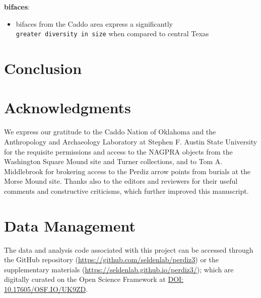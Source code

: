 \documentclass[smallextended]{svjour3}       %
\providecommand{\tightlist}{%
  \setlength{\itemsep}{0pt}\setlength{\parskip}{0pt}}
\begin{document}
\textbf{bifaces}:

\begin{itemize}
\tightlist
\item
  bifaces from the Caddo area express a significantly
  \texttt{greater\ diversity\ in\ size} when compared to central Texas
\end{itemize}

\hypertarget{conclusion}{%
\section{Conclusion}\label{conclusion}}

\hypertarget{acknowledgments}{%
\section*{Acknowledgments}\label{acknowledgments}}

We express our gratitude to the Caddo Nation of Oklahoma and the
Anthropology and Archaeology Laboratory at Stephen F. Austin State
University for the requisite permissions and access to the NAGPRA
objects from the Washington Square Mound site and Turner collections,
and to Tom A. Middlebrook for brokering access to the Perdiz arrow
points from burials at the Morse Mound site. Thanks also to the editors
and reviewers for their useful comments and constructive criticisms,
which further improved this manuscript.

\hypertarget{data-management}{%
\section*{Data Management}\label{data-management}}

The data and analysis code associated with this project can be accessed
through the GitHub repository
(\url{https://github.com/seldenlab/perdiz3}) or the supplementary
materials (\url{https://seldenlab.github.io/perdiz3/}); which are
digitally curated on the Open Science Framework at
\href{https://osf.io/vzhjr/}{DOI: 10.17605/OSF.IO/UK9ZD}.




\end{document}
